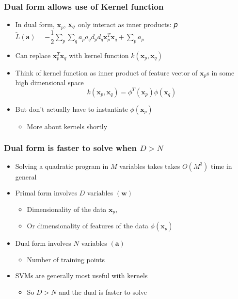 \documentclass[12pt,notes,mathserif]{beamer}
\begin{document}
\begin{frame}[c]
\frametitle{Dual form allows use of Kernel function}
\begin{itemize}
\item In dual form, $\mathbf{x}_p$, $\mathbf{x}_q$ only interact as inner products:
𝑝
$\tilde{L}(\mathbf{a})=-\dfrac{1}{2}\sum\limits_p\sum\limits_qa_pa_qd_pd_q\mathbf{x}_p^T\mathbf{x}_q+\sum\limits_pa_p$
\item Can replace $\mathbf{x}_p^T\mathbf{x}_q$ with kernel function $k(\mathbf{x}_p,\mathbf{x}_q)$
\item Think of kernel function as inner product of feature vector of $\mathbf{x}_p$s in some high dimensional space
\[
k(\mathbf{x}_p,\mathbf{x}_q)=\phi^T(\mathbf{x}_p)\phi(\mathbf{x}_q)
\]
\item But don't actually have to instantiate $\phi(\mathbf{x}_p)$
\begin{itemize}
\item More about kernels shortly
\end{itemize}
\end{itemize}
\end{frame}



\begin{frame}[c]
\frametitle{Dual form is faster to solve when $D>N$}
\begin{itemize}
\item Solving a quadratic program in $M$ variables takes takes $O(M^3)$ time in general
\item Primal form involves $D$ variables $(\mathbf{w})$
\begin{itemize}
\item Dimensionality of the data $\mathbf{x}_p$,
\item Or dimensionality of features of the data $\phi(\mathbf{x}_p)$
\end{itemize}
\item Dual form involves $N$ variables $(\mathbf{a})$
\begin{itemize}
\item Number of training points
\end{itemize}
\item SVMs are generally most useful with kernels
\begin{itemize}
\item So $D>N$ and the dual is faster to solve
\end{itemize}
\end{itemize}
\end{frame}
\end{document}
